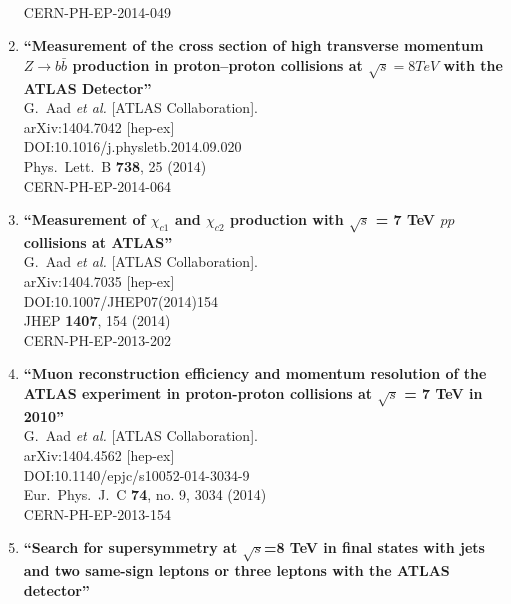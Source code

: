 \documentclass{article}
\begin{document}
\begin{enumerate}
  \\{}CERN-PH-EP-2014-049
\item%
{\bf ``Measurement of the cross section of high transverse momentum $Z\rightarrow b\bar{b}$ production in proton--proton collisions at $\sqrt{s}=8 TeV$ with the ATLAS Detector''}
  \\{}G.~Aad {\it et al.} [ATLAS Collaboration].
  \\{}arXiv:1404.7042 [hep-ex]
  \\{}DOI:10.1016/j.physletb.2014.09.020
  \\{}Phys.\ Lett.\ B {\bf 738}, 25 (2014)
  \\{}CERN-PH-EP-2014-064
\item%
{\bf ``Measurement of $\chi_{c1}$ and $\chi_{c2}$ production with $\sqrt{s}$ = 7 TeV $pp$ collisions at ATLAS''}
  \\{}G.~Aad {\it et al.} [ATLAS Collaboration].
  \\{}arXiv:1404.7035 [hep-ex]
  \\{}DOI:10.1007/JHEP07(2014)154
  \\{}JHEP {\bf 1407}, 154 (2014)
  \\{}CERN-PH-EP-2013-202
\item%
{\bf ``Muon reconstruction efficiency and momentum resolution of the ATLAS experiment in proton-proton collisions at $\sqrt{s}$ = 7 TeV in 2010''}
  \\{}G.~Aad {\it et al.} [ATLAS Collaboration].
  \\{}arXiv:1404.4562 [hep-ex]
  \\{}DOI:10.1140/epjc/s10052-014-3034-9
  \\{}Eur.\ Phys.\ J.\ C {\bf 74}, no. 9, 3034 (2014)
  \\{}CERN-PH-EP-2013-154
\item%
{\bf ``Search for supersymmetry at $\sqrt{s}$=8 TeV in final states with jets and two same-sign leptons or three leptons with the ATLAS detector''}

\end{enumerate}
\end{document}
